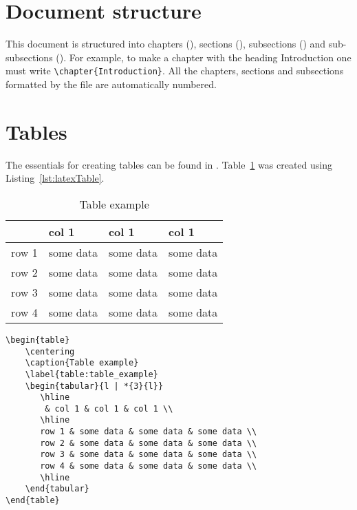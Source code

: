 \section{Document structure}
This document is structured into chapters (), sections (), 
subsections () and sub-subsections ().
For example, to make a chapter with the heading Introduction one must write 
\verb?\chapter{Introduction}?.
All the chapters, sections and subsections formatted by the  file are 
automatically numbered.

\section{Tables}

The essentials for creating tables can be found in \cite{url:latexTables}.
Table~\ref{table:tableExample} was created using Listing~\ref{lst:latexTable}.
\begin{table}
    \centering
    \caption{Table example}
    \label{table:tableExample}
    \begin{tabular}{l | *{3}{l}}
       \hline
        & col 1 & col 1 & col 1 \\
       \hline
       row 1 & some data & some data & some data \\
       row 2 & some data & some data & some data \\
       row 3 & some data & some data & some data \\
       row 4 & some data & some data & some data \\
       \hline
    \end{tabular}
\end{table}
 
\begin{lstlisting}[caption={Code for creating a LaTeX table},label={lst:latexTable}]
\begin{table}
    \centering
    \caption{Table example}
    \label{table:table_example}
    \begin{tabular}{l | *{3}{l}}
       \hline
        & col 1 & col 1 & col 1 \\
       \hline
       row 1 & some data & some data & some data \\
       row 2 & some data & some data & some data \\
       row 3 & some data & some data & some data \\
       row 4 & some data & some data & some data \\
       \hline
    \end{tabular}
\end{table}
\end{lstlisting}


